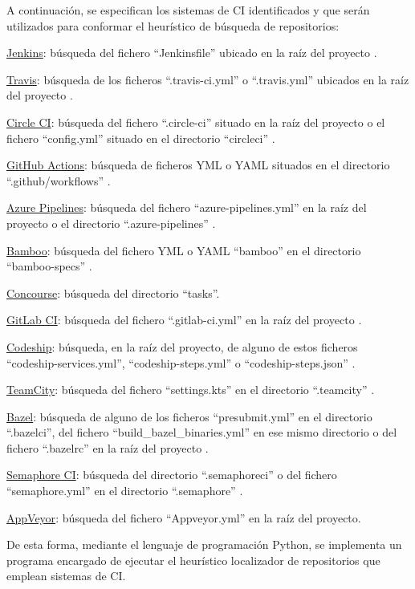 A continuación, se especifican los sistemas de CI identificados y que serán utilizados para conformar el heurístico de búsqueda de repositorios:
\begin{compactitem}
    \item \underline{Jenkins}: búsqueda del fichero ``Jenkinsfile'' ubicado en la raíz del proyecto \cite{jenkins}.
    \item \underline{Travis}: búsqueda de los ficheros ``.travis-ci.yml'' o ``.travis.yml'' ubicados en la raíz del proyecto \cite{travisCI}.
    \item \underline{Circle CI}: búsqueda del fichero ``.circle-ci'' situado en la raíz del proyecto o el fichero ``config.yml'' situado en el directorio ``circleci'' \cite{circleCI}.
    \item \underline{GitHub Actions}: búsqueda de ficheros YML o YAML situados en el directorio ``.github/workflows'' \cite{githubActions}.
    \item \underline{Azure Pipelines}: búsqueda del fichero ``azure-pipelines.yml'' en la raíz del proyecto o el directorio ``.azure-pipelines'' \cite{azurePipelines}.
    \item \underline{Bamboo}: búsqueda del fichero YML o YAML ``bamboo'' en el directorio ``bamboo-specs'' \cite{bamboo}.
    \item \underline{Concourse}: búsqueda del directorio ``tasks''\cite{concourse}.
    \item \underline{GitLab CI}: búsqueda del fichero ``.gitlab-ci.yml'' en la raíz del proyecto \cite{gitlabCI}.
    \item \underline{Codeship}: búsqueda, en la raíz del proyecto, de alguno de estos ficheros ``codeship-services.yml'', ``codeship-steps.yml'' o ``codeship-steps.json'' \cite{codeship}.
    \item \underline{TeamCity}: búsqueda del fichero ``settings.kts'' en el directorio ``.teamcity'' \cite{teamcity}.
    \item \underline{Bazel}: búsqueda de alguno de los ficheros ``presubmit.yml'' en el directorio ``.bazelci'', del fichero ``build\_bazel\_binaries.yml'' en ese mismo directorio o del fichero ``.bazelrc'' en la raíz del proyecto \cite{bazel}.
    \item \underline{Semaphore CI}: búsqueda del directorio ``.semaphoreci'' o del fichero ``semaphore.yml'' en el directorio ``.semaphore'' \cite{semaphoreCI}.
    \item \underline{AppVeyor}: búsqueda del fichero ``Appveyor.yml'' en la raíz del proyecto.
\end{compactitem}
	
De esta forma, mediante el lenguaje de programación Python, se implementa un programa encargado de ejecutar el heurístico localizador de repositorios que emplean sistemas de CI.
